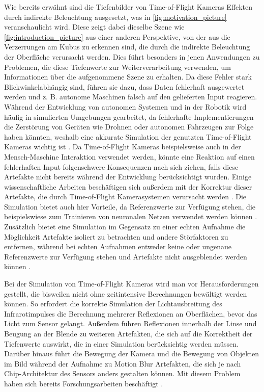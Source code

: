 \documentclass[thesis.tex]{subfiles}
\begin{document}
Wie bereits erwähnt sind die Tiefenbilder von Time-of-Flight Kameras Effekten durch indirekte Beleuchtung ausgesetzt, was in \autoref{fig:motivation_picture} veranschaulicht wird. Diese zeigt dabei dieselbe Szene wie \autoref{fig:introduction_picture} aus einer anderen Perspektive, von der aus die Verzerrungen am Kubus zu erkennen sind, die durch die indirekte Beleuchtung der Oberfläche verursacht werden. Dies führt besonders in jenen Anwendungen zu Problemen, die diese Tiefenwerte zur Weiterverarbeitung verwenden, um Informationen über die aufgenommene Szene zu erhalten. Da diese Fehler stark Blickwinkelabhängig sind, führen sie dazu, dass Daten fehlerhaft ausgewertet werden und z. B. autonome Maschinen falsch auf den gelieferten Input reagieren. Während der Entwicklung von autonomen Systemen und in der Robotik wird häufig in simulierten Umgebungen gearbeitet, da fehlerhafte Implementierungen die Zerstörung von Geräten wie Drohnen oder autonomen Fahrzeugen zur Folge haben könnten, weshalb eine akkurate Simulation der genutzten Time-of-Flight Kameras wichtig ist \cite{bib:Meister2013}. Da Time-of-Flight Kameras beispielsweise auch in der Mensch-Maschine Interaktion verwendet werden, könnte eine Reaktion auf einen fehlerhaften Input folgenschwere Konsequenzen nach sich ziehen, falls diese Artefakte nicht bereits während der Entwicklung berücksichtigt wurden. Einige wissenschaftliche Arbeiten beschäftigen sich außerdem mit der Korrektur dieser Artefakte, die durch Time-of-Flight Kamerasystemen verursacht werden \cite{bib:Su2018}\cite{bib:Mure-Dubois2007}\cite{bib:Mure-Dubois2009}\cite{bib:Freedman2014}. Die Simulation bietet auch hier Vorteile, da Referenzwerte zur Verfügung stehen, die beispielswiese zum Trainieren von neuronalen Netzen verwendet werden können \cite{bib:Su2018}. Zusätzlich bietet eine Simulation im Gegensatz zu einer echten Aufnahme die Möglichkeit Artefakte isoliert zu betrachten und andere Störfaktoren zu entfernen, während bei echten Aufnahmen entweder keine oder ungenaue Referenzwerte zur Verfügung stehen und Artefakte nicht ausgeblendet werden können \cite{bib:Nair2013}.

Bei der Simulation von Time-of-Flight Kameras wird man vor Herausforderungen gestellt, die bisweilen nicht ohne zeitintensive Berechnungen bewältigt werden können. So erfordert die korrekte Simulation der Lichtausbreitung des Infrarotimpulses die Berechnung mehrerer Reflexionen an Oberflächen, bevor das Licht zum Sensor gelangt. Außerdem führen Reflexionen innerhalb der Linse und Beugung an der Blende zu weiteren Artefakten, die sich auf die Korrektheit der Tiefenwerte auswirkt, die in einer Simulation berücksichtig werden müssen. Darüber hinaus führt die Bewegung der Kamera und die Bewegung von Objekten im Bild während der Aufnahme zu Motion Blur Artefakten, die sich je nach Chip-Architektur des Sensors anders gestalten können. Mit diesem Problem haben sich bereits Forschungsarbeiten beschäftigt \cite{bib:Lambers2015}.
\end{document}
